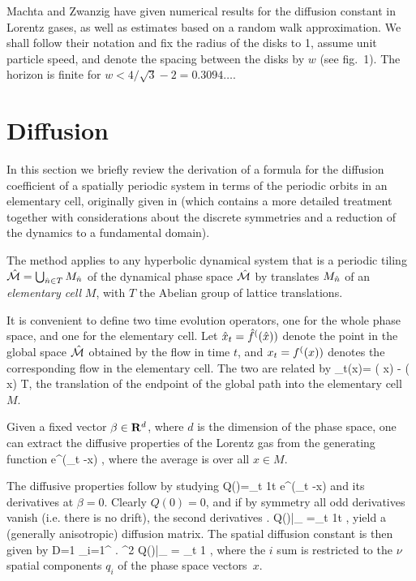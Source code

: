 \documentclass[pre,preprint,groupedaddress,showpacs,showkeys]{revtex4}
\begin{document}
Machta and Zwanzig have given numerical results
for the diffusion constant in Lorentz gases,  as well as
estimates based on a random walk approximation. We shall follow
their notation and fix the radius of the disks to 1,
assume unit particle speed, and
denote the spacing between the disks by $w$ (see fig.~1).
The horizon is finite for $w < 4/\sqrt{3}-2 = 0.3094\dots$.

\section{Diffusion}
In this section we briefly review the
derivation of a formula for the diffusion coefficient
of a spatially periodic system in terms of the periodic orbits in an elementary
cell, originally given in  (which contains
a more detailed treatment together with considerations about the
discrete symmetries and a reduction of the dynamics to a fundamental domain).

The method applies to any  hyperbolic dynamical system that is a periodic
tiling $\hat {{\cal M}}=\bigcup_{ \hat n \in T} M_{\hat n}$ of the dynamical phase space $\hat {{\cal M}}$
by translates $M_{\hat n}$ of an {\sl elementary cell} $M$, with $T$ the
Abelian group of lattice translations.

It is convenient to define two time evolution operators, one
for the whole phase space, and one for the elementary cell.
Let $\hat x_t={\hat{f}^{(}(\hat x)})$ denote the point in
the global space $\hat {{\cal M}}$ obtained by the flow in time $t$,
and $x_t={f^{(}(x)})$ denotes the corresponding flow in
the elementary cell. The two are related by
\beq \hn_t(x)= \hflow ( x) - \flow ( x) \in T\;,\label{hatn} \eeq
the translation of the endpoint of the global path into the elementary cell $M$.

Given a fixed vector $\beta \in {\bf R}^d$, where $d$ is the dimension of the
phase space, one can extract the diffusive properties of the Lorentz gas from
the generating function
\beq \langle e^{\beta \cdot (\hx_t -x) } \rangle\;,\label{generate} \eeq
where the average is over all $x \in M$.

The diffusive properties follow by studying
\beq Q(\beta)=\lim_{t\rightarrow \infty} {1\over t} \log
    \langle e^{\beta \cdot (\hx_t -x) } \rangle \label{Q} \eeq
and its derivatives at $\beta=0$. Clearly $Q(0)=0$, and if by symmetry all odd
derivatives vanish (i.e. there is no drift), the second derivatives
\beq \left . {{\partial} }
    {{\partial} }
    Q(\beta)\right |_{} =\lim_{t\rightarrow \infty} {1\over t}
     \rangle\;, \eeq
yield a (generally anisotropic) diffusion matrix.
The spatial diffusion constant is then given by
\beq D={1\over {2 \nu}} \sum_{i=1}^{\nu} \left .
    {{\partial}^2 }
   Q(\beta)\right |_{} = \lim_{t\rightarrow \infty} {1}
    \rangle\;, \label{diffus}\eeq
where the $i$ sum is restricted to the $\nu$ spatial components $q_i$ of
the phase space vectors~$x$.
\end{document}

